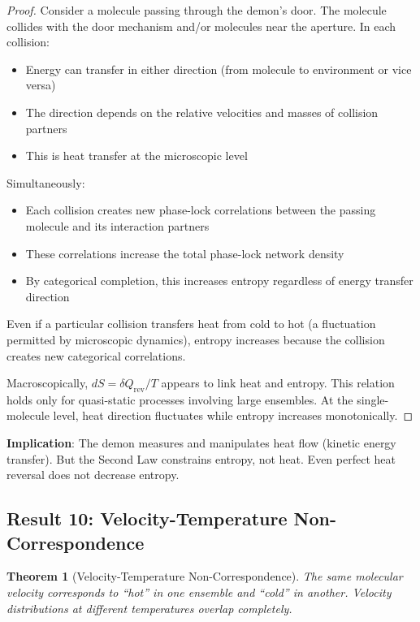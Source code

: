 \documentclass[twocolumn,showpacs,preprintnumbers,amsmath,amssymb,prd]{revtex4-2}
\newtheorem{theorem}{Theorem}[section]
\theoremstyle{definition}
\theoremstyle{remark}
\begin{document}
\begin{proof}
Consider a molecule passing through the demon's door. The molecule collides with the door mechanism and/or molecules near the aperture. In each collision:
\begin{itemize}
\item Energy can transfer in either direction (from molecule to environment or vice versa)
\item The direction depends on the relative velocities and masses of collision partners
\item This is heat transfer at the microscopic level
\end{itemize}

Simultaneously:
\begin{itemize}
\item Each collision creates new phase-lock correlations between the passing molecule and its interaction partners
\item These correlations increase the total phase-lock network density
\item By categorical completion, this increases entropy regardless of energy transfer direction
\end{itemize}

Even if a particular collision transfers heat from cold to hot (a fluctuation permitted by microscopic dynamics), entropy increases because the collision creates new categorical correlations.

Macroscopically, $dS = \delta Q_{\text{rev}}/T$ appears to link heat and entropy. This relation holds only for quasi-static processes involving large ensembles. At the single-molecule level, heat direction fluctuates while entropy increases monotonically.
\end{proof}

\textbf{Implication}: The demon measures and manipulates heat flow (kinetic energy transfer). But the Second Law constrains entropy, not heat. Even perfect heat reversal does not decrease entropy.

\subsection{Result 10: Velocity-Temperature Non-Correspondence}

\begin{theorem}[Velocity-Temperature Non-Correspondence]
\label{thm:velocity_temperature}
The same molecular velocity corresponds to ``hot'' in one ensemble and ``cold'' in another. Velocity distributions at different temperatures overlap completely.
\end{theorem}
\end{document}
